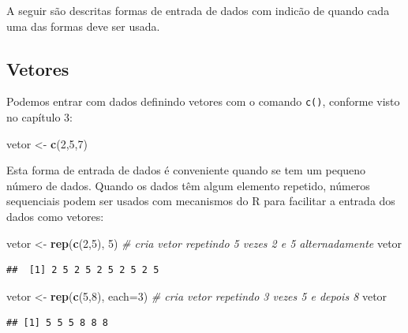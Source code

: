 \documentclass[
]{book}
\newenvironment{Shaded}{\begin{snugshade}}{\end{snugshade}}
\newcommand{\CommentTok}[1]{\textcolor[rgb]{0.56,0.35,0.01}{\textit{#1}}}
\newcommand{\DataTypeTok}[1]{\textcolor[rgb]{0.13,0.29,0.53}{#1}}
\newcommand{\DecValTok}[1]{\textcolor[rgb]{0.00,0.00,0.81}{#1}}
\newcommand{\KeywordTok}[1]{\textcolor[rgb]{0.13,0.29,0.53}{\textbf{#1}}}
\newcommand{\NormalTok}[1]{#1}
\newcommand{\StringTok}[1]{\textcolor[rgb]{0.31,0.60,0.02}{#1}}
\begin{document}
A seguir são descritas formas de entrada de dados com indicão de quando cada uma das formas deve ser usada.

\hypertarget{vetores}{%
\subsection{Vetores}\label{vetores}}

Podemos entrar com dados definindo vetores com o comando \texttt{c()}, conforme visto no capítulo 3:

\begin{Shaded}
\begin{Highlighting}[]
\NormalTok{vetor <-}\StringTok{ }\KeywordTok{c}\NormalTok{(}\DecValTok{2}\NormalTok{,}\DecValTok{5}\NormalTok{,}\DecValTok{7}\NormalTok{)}
\end{Highlighting}
\end{Shaded}

Esta forma de entrada de dados é conveniente quando se tem um pequeno número de dados. Quando os dados têm algum elemento repetido, números sequenciais podem ser usados com mecanismos do R para facilitar a entrada dos dados como vetores:

\begin{Shaded}
\begin{Highlighting}[]
\NormalTok{vetor <-}\StringTok{ }\KeywordTok{rep}\NormalTok{(}\KeywordTok{c}\NormalTok{(}\DecValTok{2}\NormalTok{,}\DecValTok{5}\NormalTok{), }\DecValTok{5}\NormalTok{)  }\CommentTok{# cria vetor repetindo 5 vezes 2 e 5 alternadamente}
\NormalTok{vetor}
\end{Highlighting}
\end{Shaded}

\begin{verbatim}
##  [1] 2 5 2 5 2 5 2 5 2 5
\end{verbatim}

\begin{Shaded}
\begin{Highlighting}[]
\NormalTok{vetor <-}\StringTok{ }\KeywordTok{rep}\NormalTok{(}\KeywordTok{c}\NormalTok{(}\DecValTok{5}\NormalTok{,}\DecValTok{8}\NormalTok{), }\DataTypeTok{each=}\DecValTok{3}\NormalTok{)  }\CommentTok{# cria vetor repetindo 3 vezes 5 e depois 8}
\NormalTok{vetor}
\end{Highlighting}
\end{Shaded}

\begin{verbatim}
## [1] 5 5 5 8 8 8
\end{verbatim}
\end{document}
